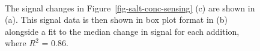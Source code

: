 \documentclass[
  a4paper,
]{scrbook}
\begin{document}
\begin{figure}
\begin{minipage}[t]{0.65\linewidth}
{{}

}

\end{minipage}%
%
\begin{minipage}[t]{0.17\linewidth}

{\centering 

~

}

\end{minipage}%

\caption{\label{fig-salt-conc-signal}The signal changes in
Figure~\ref{fig-salt-conc-sensing} (c) are shown in (a). This signal
data is then shown in box plot format in (b) alongside a fit to the
median change in signal for each addition, where \(R^2\) = 0.86.}

\end{figure}
\end{document}
